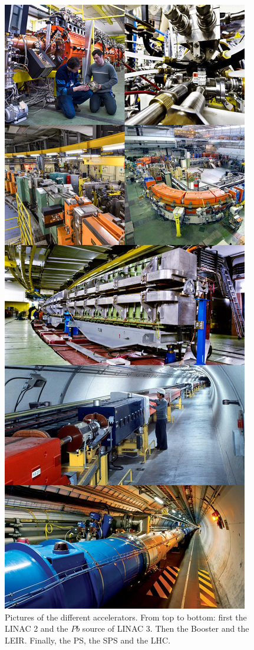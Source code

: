 	\begin{figure}[H]
		\centering
		\includegraphics[width=0.45\linewidth]{fig/chapt2/CERN-accelerators.jpg}
		\caption{\label{fig:CERNAccelerators} Pictures of the different accelerators. From top to bottom: first the LINAC 2 and the $Pb$ source of LINAC 3. Then the Booster and the LEIR. Finally, the PS, the SPS and the LHC.}
	\end{figure}
	

